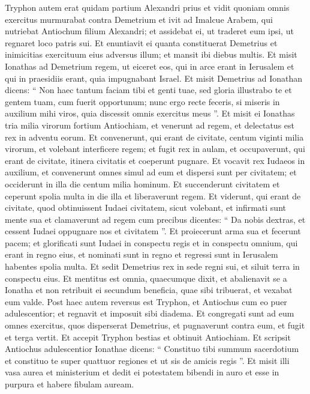 \begin{biblechapter}
\begin{biblechapter}
\begin{biblechapter}
\begin{biblechapter}
\begin{biblechapter}
\begin{biblechapter}
\begin{biblechapter}
\begin{biblechapter}
\begin{biblechapter}
\begin{biblechapter}
\begin{biblechapter}
\verse Tryphon autem erat quidam partium Alexandri prius et vidit quoniam omnis exercitus murmurabat contra Demetrium et ivit ad Imalcue Arabem, qui nutriebat Antiochum filium Alexandri; 
\verse et assidebat ei, ut traderet eum ipsi, ut regnaret loco patris sui. Et enuntiavit ei quanta constituerat Demetrius et inimicitias exercituum eius adversus illum; et mansit ibi diebus multis.
 \verse Et misit Ionathas ad Demetrium regem, ut eiceret eos, qui in arce erant in Ierusalem et qui in praesidiis erant, quia impugnabant Israel. 
\verse Et misit Demetrius ad Ionathan dicens: “ Non haec tantum faciam tibi et genti tuae, sed gloria illustrabo te et gentem tuam, cum fuerit opportunum; 
\verse nunc ergo recte feceris, si miseris in auxilium mihi viros, quia discessit omnis exercitus meus ”. 
\verse Et misit ei Ionathas tria milia virorum fortium Antiochiam, et venerunt ad regem, et delectatus est rex in adventu eorum. 
\verse Et convenerunt, qui erant de civitate, centum viginti milia virorum, et volebant interficere regem; 
\verse et fugit rex in aulam, et occupaverunt, qui erant de civitate, itinera civitatis et coeperunt pugnare. 
\verse Et vocavit rex Iudaeos in auxilium, et convenerunt omnes simul ad eum et dispersi sunt per civitatem; et occiderunt in illa die centum milia hominum. 
\verse Et succenderunt civitatem et ceperunt spolia multa in die illa et liberaverunt regem. 
\verse Et viderunt, qui erant de civitate, quod obtinuissent Iudaei civitatem, sicut volebant, et infirmati sunt mente sua et clamaverunt ad regem cum precibus dicentes: 
\verse “ Da nobis dextras, et cessent Iudaei oppugnare nos et civitatem ”. 
\verse Et proiecerunt arma sua et fecerunt pacem; et glorificati sunt Iudaei in conspectu regis et in conspectu omnium, qui erant in regno eius, et nominati sunt in regno et regressi sunt in Ierusalem habentes spolia multa. 
\verse Et sedit Demetrius rex in sede regni sui, et siluit terra in conspectu eius. 
\verse Et mentitus est omnia, quaecumque dixit, et abalienavit se a Ionatha et non retribuit ei secundum beneficia, quae sibi tribuerat, et vexabat eum valde.
 \verse Post haec autem reversus est Tryphon, et Antiochus cum eo puer adulescentior; et regnavit et imposuit sibi diadema. 
\verse Et congregati sunt ad eum omnes exercitus, quos disperserat Demetrius, et pugnaverunt contra eum, et fugit et terga vertit. 
\verse Et accepit Tryphon bestias et obtinuit Antiochiam. 
\verse Et scripsit Antiochus adulescentior Ionathae dicens: “ Constituo tibi summum sacerdotium et constituo te super quattuor regiones et ut sis de amicis regis ”. 
 \verse Et misit illi vasa aurea et ministerium et dedit ei potestatem bibendi in auro et esse in purpura et habere fibulam auream. 

\end{biblechapter}
\end{biblechapter}
\end{biblechapter}
\end{biblechapter}
\end{biblechapter}
\end{biblechapter}
\end{biblechapter}
\end{biblechapter}
\end{biblechapter}
\end{biblechapter}
\end{biblechapter}
